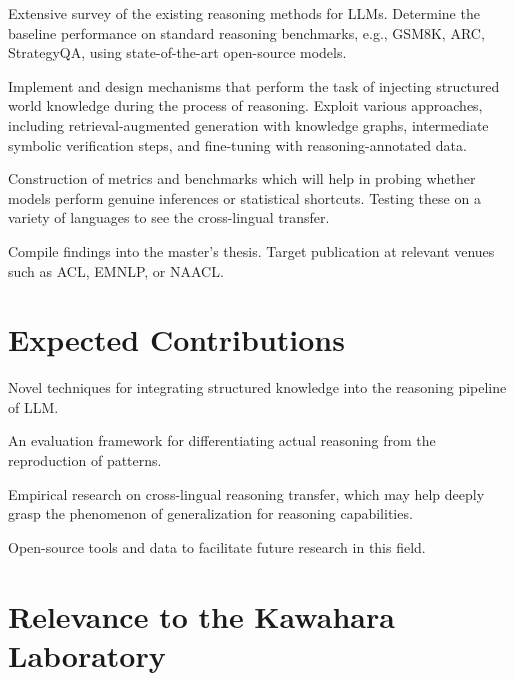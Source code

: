 
Extensive survey of the existing reasoning methods for LLMs. Determine the baseline performance on standard reasoning benchmarks, e.g., GSM8K, ARC, StrategyQA, using state-of-the-art open-source models.


Implement and design mechanisms that perform the task of injecting structured world knowledge during the process of reasoning. Exploit various approaches, including retrieval-aug\-ment\-ed generation with knowledge graphs, intermediate symbolic verification steps, and fine-tuning with reasoning-annotated data.


Construction of metrics and benchmarks which will help in probing whether models perform genuine inferences or statistical shortcuts. Testing these on a variety of languages to see the cross-lingual transfer.


Compile findings into the master's thesis. Target publication at relevant venues such as ACL, EMNLP, or NAACL.

\section{Expected Contributions}

\begin{bullets}
    \item Novel techniques for integrating structured knowledge into the reasoning pipeline of LLM.
    \item An evaluation framework for differentiating actual reasoning from the reproduction of patterns.
    \item Empirical research on cross-lingual reasoning transfer, which may help deeply grasp the phenomenon of generalization for reasoning capabilities.
    \item Open-source tools and data to facilitate future research in this field.
\end{bullets}

\section{Relevance to the Kawahara Laboratory}


